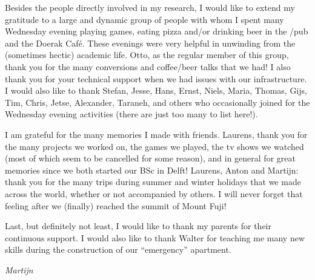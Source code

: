 Besides the people directly involved in my research, I would like to extend my gratitude to a large and dynamic group of people with whom I spent many Wednesday evening playing games, eating pizza and/or drinking beer in the /pub and the Doerak Café.
These evenings were very helpful in unwinding from the (sometimes hectic) academic life.
Otto, as the regular member of this group, thank you for the many conversions and coffee/beer talks that we had!
I also thank you for your technical support when we had issues with our infrastructure.
I would also like to thank Stefan, Jesse, Hans, Ernst, Niels, Maria, Thomas, Gijs, Tim, Chris, Jetse, Alexander, Taraneh, and others who occasionally joined for the Wednesday evening activities (there are just too many to list here!).

I am grateful for the many memories I made with friends.
Laurens, thank you for the many projects we worked on, the games we played, the tv shows we watched (most of which seem to be cancelled for some reason), and in general for great memories since we both started our BSc in Delft!
Laurens, Anton and Martijn: thank you for the many trips during summer and winter holidays that we made across the world, whether or not accompanied by others.
I will never forget that feeling after we (finally) reached the summit of Mount Fuji!\emojifuji{}

Last, but definitely not least, I would like to thank my parents for their continuous support.
I would also like to thank Walter for teaching me many new skills during the construction of our \enquote{emergency} apartment.

\begin{flushright}
{\makeatletter\itshape
    Martijn
\makeatother}
\end{flushright}

